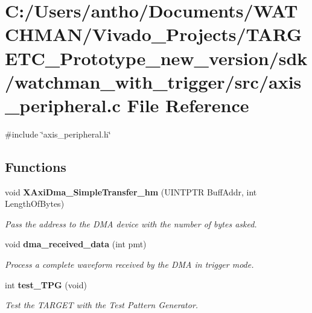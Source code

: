 \section{C\+:/\+Users/antho/\+Documents/\+W\+A\+T\+C\+H\+M\+A\+N/\+Vivado\+\_\+\+Projects/\+T\+A\+R\+G\+E\+T\+C\+\_\+\+Prototype\+\_\+new\+\_\+version/sdk/watchman\+\_\+with\+\_\+trigger/src/axis\+\_\+peripheral.c File Reference}
\label{axis__peripheral_8c}
{\ttfamily \#include \char`\"{}axis\+\_\+peripheral.\+h\char`\"{}}\newline
\subsection*{Functions}
\begin{DoxyCompactItemize}
\item 
void \textbf{ X\+Axi\+Dma\+\_\+\+Simple\+Transfer\+\_\+hm} (U\+I\+N\+T\+P\+TR Buff\+Addr, int Length\+Of\+Bytes)
\begin{DoxyCompactList}\small\item\em Pass the address to the D\+MA device with the number of bytes asked. \end{DoxyCompactList}\item 
void \textbf{ dma\+\_\+received\+\_\+data} (int pmt)
\begin{DoxyCompactList}\small\item\em Process a complete waveform received by the D\+MA in trigger mode. \end{DoxyCompactList}\item 
int \textbf{ test\+\_\+\+T\+PG} (void)
\begin{DoxyCompactList}\small\item\em Test the T\+A\+R\+G\+ET with the Test Pattern Generator. \end{DoxyCompactList}\end{DoxyCompactItemize}
